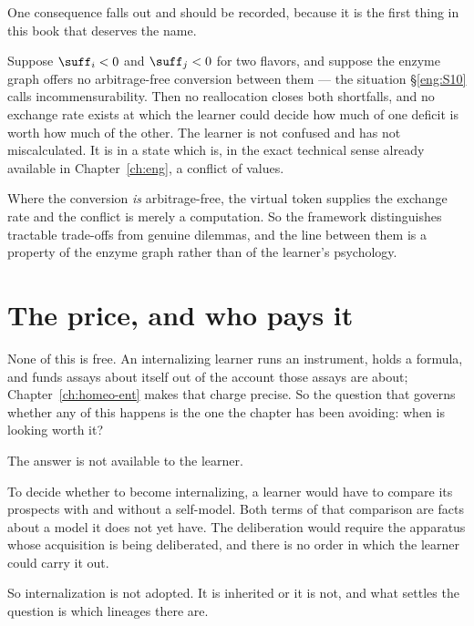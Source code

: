 \begin{remark}
\label{suf:rem:conflict}
One consequence falls out and should be recorded, because it is the
first thing in this book that deserves the name.

Suppose $\suff_i < 0$ and $\suff_j < 0$ for two flavors, and suppose the
enzyme graph offers no arbitrage-free conversion between them --- the
situation \S\ref{eng:S10} calls incommensurability.
Then no reallocation closes both shortfalls, and no exchange rate exists
at which the learner could decide how much of one deficit is worth how
much of the other.
The learner is not confused and has not miscalculated.
It is in a state which is, in the exact technical sense already available
in Chapter~\ref{ch:eng}, a conflict of values.

Where the conversion \emph{is} arbitrage-free, the virtual token supplies
the exchange rate and the conflict is merely a computation.
So the framework distinguishes tractable trade-offs from genuine
dilemmas, and the line between them is a property of the enzyme graph
rather than of the learner's psychology.
\end{remark}

\section{The price, and who pays it}
\label{suf:S5}

None of this is free.
An internalizing learner runs an instrument, holds a formula, and funds
assays about itself out of the account those assays are about;
Chapter~\ref{ch:homeo-ent} makes that charge precise.
So the question that governs whether any of this happens is the one the
chapter has been avoiding: when is looking worth it?

The answer is not available to the learner.

\begin{remark}
\label{suf:rem:no-decision}
To decide whether to become internalizing, a learner would have to
compare its prospects with and without a self-model.
Both terms of that comparison are facts about a model it does not yet
have.
The deliberation would require the apparatus whose acquisition is being
deliberated, and there is no order in which the learner could carry it
out.

So internalization is not adopted.
It is inherited or it is not, and what settles the question is which
lineages there are.
\end{remark}

